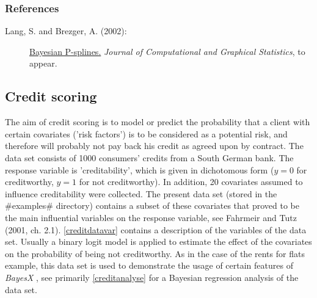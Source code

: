 \subsubsection*{References}

\begin{description}

\item[Lang, S. and Brezger, A. (2002):] \href{http://www.stat.uni-muenchen.de/~lang/publications.html}
{Bayesian P-splines.} {\it Journal of Computational and Graphical
Statistics}, to appear.

\end{description}


\subsection{Credit scoring}
\label{creditdata}  

The aim of credit scoring is to model or predict the probability
that a client with certain covariates ('risk factors') is to be
considered as a potential risk, and therefore will probably not
pay back his credit as agreed upon by contract. The data set
consists of 1000 consumers' credits from a South German bank. The
response variable is 'creditability', which is given in
dichotomous form ($y=0$ for creditworthy, $y=1$ for not
creditworthy). In addition, 20 covariates assumed to influence
creditability were collected. The present data set (stored in the
#examples# directory)  contains a subset of these covariates
that proved to be the main influential variables on the response
variable, see Fahrmeir and Tutz (2001, ch. 2.1). \autoref{creditdatavar}
contains a description of the variables of the data set. Usually a
binary logit model is applied to estimate the effect of the
covariates on the probability of being not creditworthy. As in the
case of the rents for flats example, this data set is used to
demonstrate the usage of certain features of {\em BayesX} , see
primarily \autoref{creditanalyse} for a Bayesian regression
analysis of the data set.

